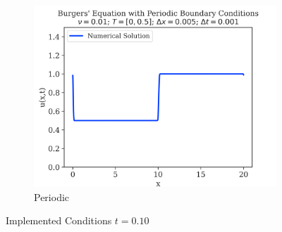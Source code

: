 \begin{figure}
\begin{subfigure}{0.55\linewidth}
		\includegraphics[width=\linewidth]{../periodic_BC/images_nu=0.01/100_plot}
		\caption{Periodic}
	\end{subfigure}

	\caption{Implemented Conditions $t=0.10$}
	\label{fig:0.1-figures}
\end{figure}


